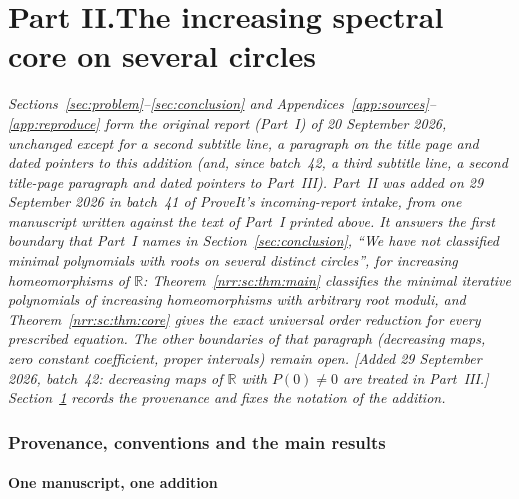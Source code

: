 \documentclass[11pt,letterpaper]{article}
\theoremstyle{definition}
\theoremstyle{remark}
\newcommand{\R}{\mathbb R}
\begin{document}
\clearpage
{}\part*{Part II.\quad The increasing spectral core on several circles}

\noindent\emph{Sections~\ref{sec:problem}--\ref{sec:conclusion} and
Appendices~\ref{app:sources}--\ref{app:reproduce} form the original report
(Part~I) of 20 September 2026, unchanged except for a second subtitle line,
a paragraph on the title page and dated pointers to this addition (and, since
batch~42, a third subtitle line, a second title-page paragraph and dated
pointers to Part~III). Part~II was added on 29 September 2026 in batch~41 of ProveIt's
incoming-report intake, from one manuscript written against the text of
Part~I printed above. It answers the first boundary that Part~I names in
Section~\ref{sec:conclusion}, ``We have not classified minimal polynomials
with roots on several distinct circles'', for increasing homeomorphisms of
$\R$: Theorem~\ref{nrr:sc:thm:main} classifies the minimal iterative
polynomials of increasing homeomorphisms with arbitrary root moduli, and
Theorem~\ref{nrr:sc:thm:core} gives the exact universal order reduction for
every prescribed equation. The other boundaries of that paragraph (decreasing
maps, zero constant coefficient, proper intervals) remain open.
[Added 29 September 2026, batch~42: decreasing maps of $\R$ with $P(0)\ne0$
are treated in Part~III.]
Section~\ref{nrr:sc:sec:intro} records the provenance and fixes the notation
of the addition.}

\section{Provenance, conventions and the main results}
\label{nrr:sc:sec:intro}

\subsection{One manuscript, one addition}
\label{nrr:sc:sec:source}
\end{document}
